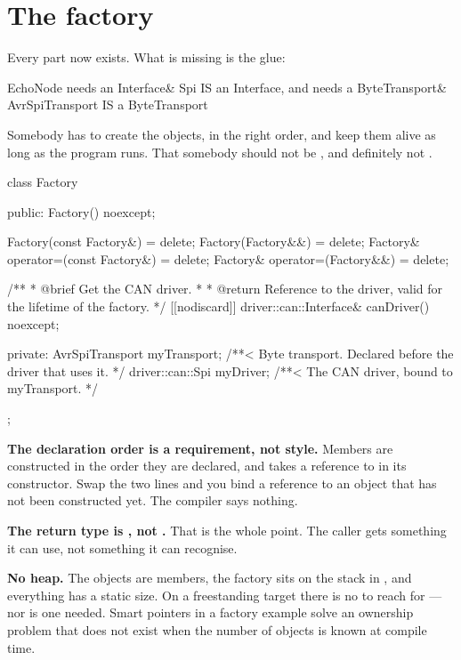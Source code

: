 \section{The factory}
\label{sec:factory}

Every part now exists. What is missing is the glue:

\begin{console}
EchoNode         needs an   Interface&
Spi              IS an      Interface,  and needs a ByteTransport&
AvrSpiTransport  IS a       ByteTransport
\end{console}

Somebody has to create the objects, in the right order, and keep them alive as long as the program
runs. That somebody should not be , and definitely not .

\begin{cppcode}
class Factory
{
public:
    Factory() noexcept;

    Factory(const Factory&)            = delete;
    Factory(Factory&&)                 = delete;
    Factory& operator=(const Factory&) = delete;
    Factory& operator=(Factory&&)      = delete;

    /**
     * @brief Get the CAN driver.
     *
     * @return Reference to the driver, valid for the lifetime of the factory.
     */
    [[nodiscard]] driver::can::Interface& canDriver() noexcept;

private:
    AvrSpiTransport myTransport; /**< Byte transport. Declared before the driver that uses it. */
    driver::can::Spi myDriver;   /**< The CAN driver, bound to myTransport. */
};
\end{cppcode}

\textbf{The declaration order is a requirement, not style.} Members are constructed in the order
they are declared, and  takes a reference to  in its constructor.
Swap the two lines and you bind a reference to an object that has not been constructed yet. The
compiler says nothing.

\textbf{The return type is , not .} That is the whole point. The
caller gets something it can use, not something it can recognise.

\textbf{No heap.} The objects are members, the factory sits on the stack in , and
everything has a static size. On a freestanding target there is no  to reach
for --- nor is one needed. Smart pointers in a factory example solve an ownership problem that does
not exist when the number of objects is known at compile time.

